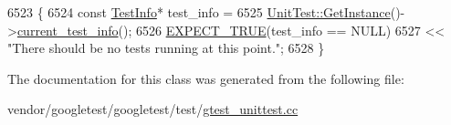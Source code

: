 \begin{DoxyCode}
6523                                  \{
6524     \textcolor{keyword}{const} \hyperlink{classtesting_1_1TestInfo}{TestInfo}* test\_info =
6525       \hyperlink{classtesting_1_1UnitTest_a24192400b70b3b946746954e9574fb8e}{UnitTest::GetInstance}()->\hyperlink{classtesting_1_1UnitTest_a088eaf814a33085ace3d881d22e6bdea}{current\_test\_info}();
6526     \hyperlink{gtest_8h_ac33e7cdfb5d44a7a0f0ab552eb5c3c6a}{EXPECT\_TRUE}(test\_info == NULL)
6527         << \textcolor{stringliteral}{"There should be no tests running at this point."};
6528   \}
\end{DoxyCode}


The documentation for this class was generated from the following file\+:\begin{DoxyCompactItemize}
\item 
vendor/googletest/googletest/test/\hyperlink{gtest__unittest_8cc}{gtest\+\_\+unittest.\+cc}\end{DoxyCompactItemize}

